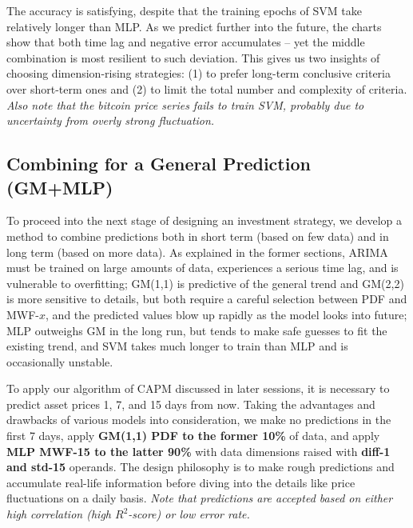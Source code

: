 \documentclass{mcmthesis}
\begin{document}
{	The accuracy is satisfying, despite that the training epochs of SVM take relatively longer than MLP. As we predict further into the future, the charts show that both time lag and negative error accumulates -- yet the middle combination is most resilient to such deviation. This gives us two insights of choosing dimension-rising strategies: (1) to prefer long-term conclusive criteria over short-term ones and (2) to limit the total number and complexity of criteria. \textit{Also note that the bitcoin price series fails to train SVM, probably due to uncertainty from overly strong fluctuation. }
	
	\subsection{Combining for a General Prediction (GM+MLP)}
	\label{sec:3.4}
	
	To proceed into the next stage of designing an investment strategy, we develop a method to combine predictions both in short term (based on few data) and in long term (based on more data). As explained in the former sections, ARIMA must be trained on large amounts of data, experiences a serious time lag, and is vulnerable to overfitting; GM(1,1) is predictive of the general trend and GM(2,2) is more sensitive to details, but both require a careful selection between PDF and MWF-$x$, and the predicted values blow up rapidly as the model looks into future; MLP outweighs GM in the long run, but tends to make safe guesses to fit the existing trend, and SVM takes much longer to train than MLP and is occasionally unstable. 
	
	To apply our algorithm of CAPM discussed in later sessions, it is necessary to predict asset prices 1, 7, and 15 days from now. Taking the advantages and drawbacks of various models into consideration, we make no predictions in the first 7 days, apply \textbf{GM(1,1) PDF to the former 10\%} of data, and apply \textbf{MLP MWF-15 to the latter 90\%} with data dimensions raised with \textbf{diff-1 and std-15} operands. The design philosophy is to make rough predictions and accumulate real-life information before diving into the details like price fluctuations on a daily basis. \textit{Note that predictions are accepted based on either high correlation (high $R^2$-score) or low error rate. }
	
}
\end{document}
